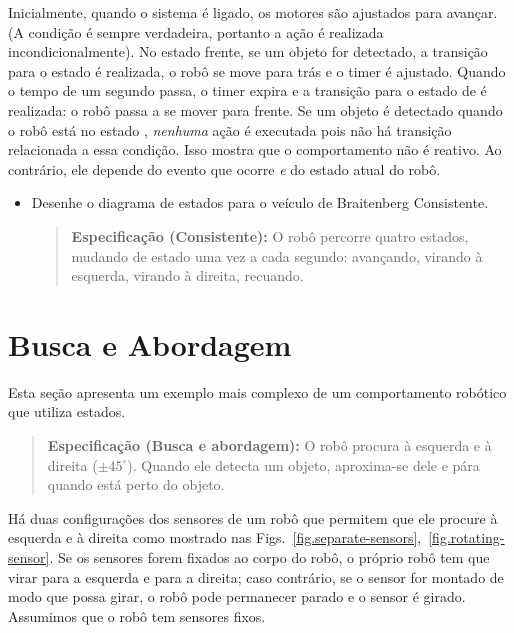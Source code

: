 Inicialmente, quando o sistema é ligado, os motores são ajustados para avançar. (A condição  é sempre verdadeira, portanto a ação é realizada incondicionalmente). No estado {frente}, se um objeto for detectado,
 a transição para o estado  é realizada, o robô se move para trás e o timer é ajustado. Quando o tempo de um segundo passa, o timer expira e a transição para o estado de  é realizada: o robô passa a se mover para frente. Se um objeto é detectado quando o robô está no estado , \emph{nenhuma} ação é executada pois não há transição relacionada a essa condição. Isso mostra que o comportamento não é reativo. Ao contrário, ele depende do evento que ocorre \emph{e} do estado atual do robô.

\enlargethispage{\baselineskip}

\begin{framed}
\begin{itemize}
\item Desenhe o diagrama de estados para o veículo de Braitenberg Consistente.
\begin{quote}
\normalsize\noindent\textbf{Especificação (Consistente):} O robô percorre quatro estados, mudando de estado uma vez a cada segundo: avançando, virando à esquerda, virando à direita, recuando.
\end{quote}
\end{itemize}
\end{framed}

\section{Busca e Abordagem}\label{s.search-and-approach}

Esta seção apresenta um exemplo mais complexo de um comportamento robótico que utiliza estados.

\begin{quote}
\normalsize\noindent\textbf{Especificação (Busca e abordagem):} O robô procura à esquerda e à direita ($\pm 45^{\circ}$). Quando ele detecta um objeto, aproxima-se dele e pára quando está perto do objeto.
\end{quote}

Há duas configurações dos sensores de um robô que permitem que ele procure à esquerda e à direita como mostrado nas Figs.~\ref{fig.separate-sensors},~\ref{fig.rotating-sensor}. Se os sensores forem fixados ao corpo do robô, o próprio robô tem que virar para a esquerda e para a direita; caso contrário, se o sensor for montado de modo que possa girar, o robô pode permanecer parado e o sensor é girado. Assumimos que o robô tem sensores fixos.

